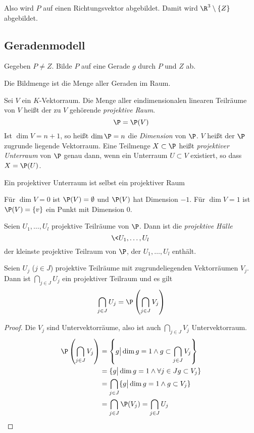 \documentclass[a4paper, 10pt]{scrbook}
\begin{document}
Also wird $P$ auf einen Richtungsvektor abgebildet.
Damit wird $\R^3\setminus \{Z\}$ abgebildet.


\subsection{Geradenmodell}


Gegeben $P\neq Z$.
Bilde $P$ auf eine Gerade $g$ durch $P$ und $Z$ ab.

Die Bildmenge ist die Menge aller Geraden im Raum.

\begin{df}
	\label{df:15.1}
	Sei $V$ ein $K$-Vektorraum.
	Die Menge aller eindimensionalen linearen Teilräume von $V$ heißt der zu $V$ gehörende \emph{projektive Raum}.
	\[
		\P = \P(V) 
	\]
	Ist $\dim V=n+1$, so heißt $\dim \P = n$ die \emph{Dimension} von $\P$.
	$V$ heißt der $\P$ zugrunde liegende Vektorraum.
	Eine Teilmenge $X\subset \P$ heißt \emph{projektiver Unterraum} von $\P$ genau dann, wenn ein Unterraum $U\subset V$ existiert, so dass $X=\P(U)$.
\end{df}

\begin{note}
	Ein projektiver Unterraum ist selbst ein projektiver Raum
\end{note}

\begin{ex}
	Für $\dim V=0$ ist $\P(V) = \emptyset$  und $\P(V)$ hat Dimension $-1$.
	Für $\dim V=1$ ist $\P(V) = \{v\}$ ein Punkt mit Dimension $0$.
\end{ex}

\begin{df}
	\label{df:15.2}
	Seien $U_1,\dotsc,U_l$ projektive Teilräume von $\P$.
	Dann ist die \emph{projektive Hülle}
	\[
		\<U_1,\dotsc,U_l\>
	\]
	der kleinste projektive Teilraum von $\P$, der $U_1,\dotsc,U_l$ enthält.
\end{df}

\begin{lem}
	\label{lem:15.3}
	Seien $U_j$ ($j\in J$) projektive Teilräume mit zugrundeliegenden Vektorräumen $V_j$.
	Dann ist $\bigcap_{j\in J} U_j$	ein projektiver Teilraum und es gilt
	\[
		\bigcap_{j\in J}U_j = \P\left(\bigcap_{j\in J}V_j\right)
	\]
	\begin{proof}
		Die $V_j$ sind Untervektorräume, also ist auch $\bigcap_{j\in J}V_j$ Untervektorraum.
		\begin{align*}
			\P\left(\bigcap_{j\in J}V_j\right) &= \left\{ g \big| \dim g = 1 \land g\subset \bigcap_{j\in J}V_j\right\}\\
			&= \{g \big| \dim g=1 \land \forall j\in Jg\subset V_j \}\\
			&= \bigcap_{j\in J}\{ g\big| \dim g=1 \land g\subset V_j\}\\
			&= \bigcap_{j\in J}\P(V_j) = \bigcap_{j\in J}U_j
		\end{align*}
	\end{proof}
\end{lem}
\end{document}
